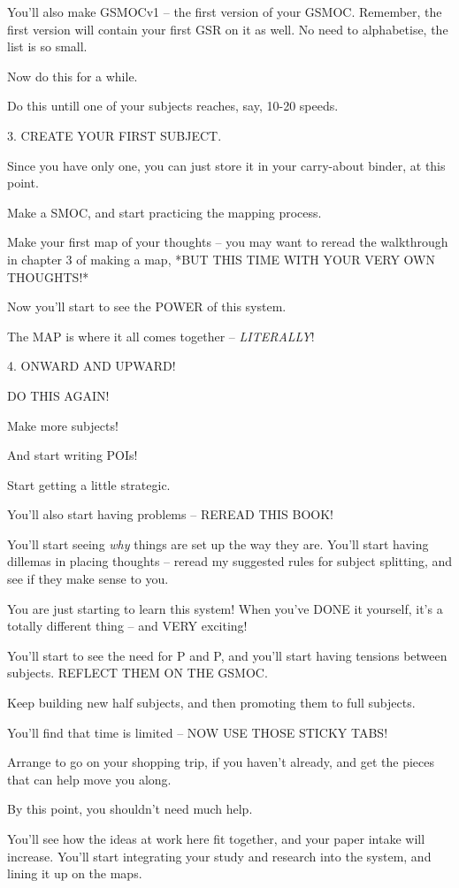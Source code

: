 \documentclass[oneside]{scrbook}
\begin{document}
You'll also make GSMOCv1 -- the first version of your GSMOC. Remember,
the first version will contain your first GSR on it as well. No need
to alphabetise, the list is so small.

Now do this for a while.

Do this untill one of your subjects reaches, say, 10-20 speeds.

3. CREATE YOUR FIRST SUBJECT.

Since you have only one, you can just store it in your carry-about
binder, at this point.

Make a SMOC, and start practicing the mapping process.

Make your first map of your thoughts -- you may want to reread the
walkthrough in chapter 3 of making a map, *BUT THIS TIME WITH YOUR
VERY OWN THOUGHTS!*

Now you'll start to see the POWER of this system.

The MAP is where it all comes together -- \emph{LITERALLY}!

4. ONWARD AND UPWARD!

DO THIS AGAIN!

Make more subjects!

And start writing POIs!

Start getting a little strategic.

You'll also start having problems -- REREAD THIS BOOK!

You'll start seeing \emph{why} things are set up the way they are. You'll
start having dillemas in placing thoughts -- reread my suggested rules
for subject splitting, and see if they make sense to you.

You are just starting to learn this system! When you've DONE it
yourself, it's a totally different thing -- and VERY exciting!

You'll start to see the need for P and P, and you'll start having tensions
between subjects. REFLECT THEM ON THE GSMOC.

Keep building new half subjects, and then promoting them to full
subjects.

You'll find that time is limited -- NOW USE THOSE STICKY TABS!

Arrange to go on your shopping trip, if you haven't already, and get
the pieces that can help move you along.

By this point, you shouldn't need much help.

You'll see how the ideas at work here fit together, and your paper
intake will increase. You'll start integrating your study and research
into the system, and lining it up on the maps.
\end{document}
